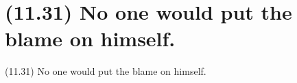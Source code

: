 \documentclass{article}
\begin{document}
\clearpage

%
%

\section*{(11.31) No one would put the blame on himself.}

\bigbreak
\begin{enumerate*}
\item[(11.31)] No one would put the blame on himself.
\end{enumerate*}
\bigbreak
\end{document}
